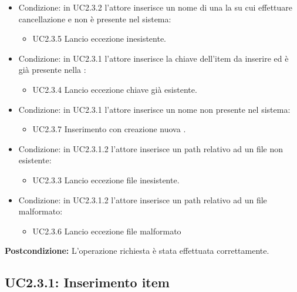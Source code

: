 \documentclass{scalatekids-article}
\begin{document}
\begin{itemize}
\item Condizione: in UC2.3.2 l'attore inserisce un nome di una la  su cui effettuare cancellazione e non è presente nel sistema:
  \begin{itemize}
  \item UC2.3.5 Lancio eccezione  inesistente.
  \end{itemize}
\item Condizione: in UC2.3.1 l'attore inserisce la chiave dell'item da inserire ed è già presente nella :
  \begin{itemize}
  \item UC2.3.4 Lancio eccezione chiave già esistente.
  \end{itemize}
\item Condizione: in UC2.3.1 l'attore inserisce un nome  non presente nel sistema:
  \begin{itemize}
  \item UC2.3.7 Inserimento con creazione nuova .
  \end{itemize}
\item Condizione: in UC2.3.1.2 l'attore inserisce un path relativo ad un file non esistente:
  \begin{itemize}
  \item UC2.3.3 Lancio eccezione file inesistente.
  \end{itemize}
\item Condizione: in UC2.3.1.2 l'attore inserisce un path relativo ad un file malformato: %
  \begin{itemize}
  \item UC2.3.6 Lancio eccezione file malformato
  \end{itemize}
\end{itemize}
\textbf{Postcondizione:} L'operazione richiesta è stata effettuata correttamente.

\subsection{UC2.3.1: Inserimento item}
\end{document}
